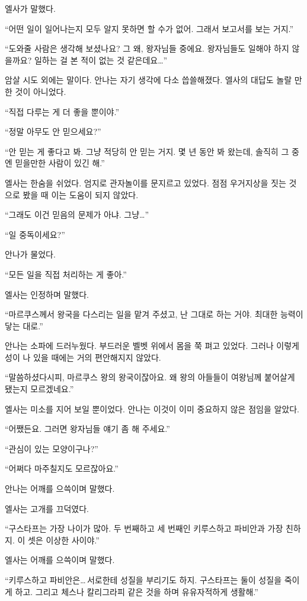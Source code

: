 엘사가 말했다.

``어떤 일이 일어나는지 모두 알지 못하면 할 수가 없어. 그래서 보고서를 보는 거지.''

``도와줄 사람은 생각해 보셨나요? 그 왜, 왕자님들 중에요. 왕자님들도 일해야 하지 않을까요? 일하는 걸 본 적이 없는 것 같은데요\ldots''

암살 시도 외에는 말이다. 안나는 자기 생각에 다소 씁쓸해졌다. 엘사의 대답도 놀랄 만한 것이 아니었다.

``직접 다루는 게 더 좋을 뿐이야.''

``정말 아무도 안 믿으세요?''

``안 믿는 게 좋다고 봐. 그냥 적당히 안 믿는 거지. 몇 년 동안 봐 왔는데, 솔직히 그 중엔 믿을만한 사람이 있긴 해.''

엘사는 한숨을 쉬었다. 엄지로 관자놀이를 문지르고 있었다. 점점 우거지상을 짓는 것으로 봤을 때 이는 도움이 되지 않았다.

``그래도 이건 믿음의 문제가 아냐. 그냥\ldots''

``일 중독이세요?''

안나가 물었다.

``모든 일을 직접 처리하는 게 좋아.''

엘사는 인정하며 말했다.

``마르쿠스께서 왕국을 다스리는 일을 맡겨 주셨고, 난 그대로 하는 거야. 최대한 능력이 닿는 대로.''

안나는 소파에 드러누웠다. 부드러운 벨벳 위에서 몸을 쭉 펴고 있었다. 그러나 이렇게 성이 나 있을 때에는 거의 편안해지지 않았다.

``말씀하셨다시피, 마르쿠스 왕의 왕국이잖아요. 왜 왕의 아들들이 여왕님께 붙어살게 됐는지 모르겠네요.''

엘사는 미소를 지어 보일 뿐이었다. 안나는 이것이 이미 중요하지 않은 점임을 알았다.

``어쨌든요. 그러면 왕자님들 얘기 좀 해 주세요.''

``관심이 있는 모양이구나?''

``어쩌다 마주칠지도 모르잖아요.''

안나는 어깨를 으쓱이며 말했다.

엘사는 고개를 끄덕였다.

``구스타프는 가장 나이가 많아. 두 번째하고 세 번째인 키루스하고 파비안과 가장 친하지. 이 셋은 이상한 사이야.''

엘사는 어깨를 으쓱이며 말했다.

``키루스하고 파비안은\ldots\,서로한테 성질을 부리기도 하지. 구스타프는 둘이 성질을 죽이게 하고. 그리고 체스나 칼리그라피 같은 것을 하며 유유자적하게 생활해.''

